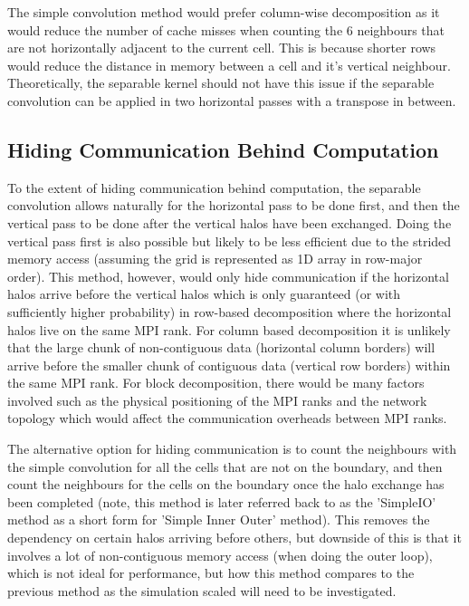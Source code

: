     The simple convolution method would prefer column-wise decomposition as it would reduce the number of cache misses
    when counting the 6 neighbours that are not horizontally adjacent to the current cell.
    This is because shorter rows would reduce the distance in memory between a cell and it's vertical neighbour.
    Theoretically, the separable kernel should not have this issue if the separable convolution can be applied in two horizontal
    passes with a transpose in between.

    \subsection{Hiding Communication Behind Computation}\label{subsec:hiding-comms}
    To the extent of hiding communication behind computation, the separable convolution allows naturally for the horizontal
    pass to be done first, and then the vertical pass to be done after the vertical halos have been exchanged.
    Doing the vertical pass first is also possible but likely to be less efficient due to the strided memory access (assuming
    the grid is represented as 1D array in row-major order).
    This method, however, would only hide communication if the horizontal halos arrive before the vertical halos which is
    only guaranteed (or with sufficiently higher probability) in row-based decomposition where the horizontal halos live
    on the same MPI rank.
    For column based decomposition it is unlikely that the large chunk of non-contiguous data (horizontal column borders)
    will arrive before the smaller chunk of contiguous data (vertical row borders) within the same MPI rank.
    For block decomposition, there would be many factors involved such as the physical positioning of the MPI ranks and the network
    topology which would affect the communication overheads between MPI ranks.

    The alternative option for hiding communication is to count the neighbours with the simple convolution
    for all the cells that are not on the boundary, and then count the neighbours for the cells on the boundary once the halo
    exchange has been completed (note, this method is later referred back to as the 'SimpleIO' method as a short form for
    'Simple Inner Outer' method).
    This removes the dependency on certain halos arriving before others, but downside of this is that it involves a lot
    of non-contiguous memory access (when doing the outer loop), which is not ideal for performance, but how this method
    compares to the previous method as the simulation scaled will need to be investigated.

